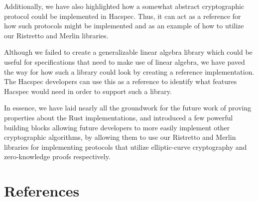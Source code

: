 \documentclass{article}
\begin{document}
Additionally, we have also highlighted how a somewhat abstract
cryptographic protocol could be implemented in Hacspec. Thus, it can
act as a reference for how such protocols might be implemented and
as an example of how to utilize our Ristretto and Merlin libraries.

Although we failed to create a generalizable linear algebra library
which could be useful for specifications that need to make use of
linear algebra, we have paved the way for how such a library could
look by creating a reference implementation. The Hacspec developers
can use this as a reference to identify what features Hacspec would
need in order to support such a library.

In essence, we have laid nearly all the groundwork for the future work
of proving properties about the Rust implementations, and introduced a
few powerful building blocks allowing future developers to more easily
implement other cryptographic algorithms, by allowing them to use our
Ristretto and Merlin libraries for implementing protocols that utilize
elliptic-curve cryptography and zero-knowledge proofs respectively.

\newpage

\section{References} \label{references}
\printbibliography
\end{document}

